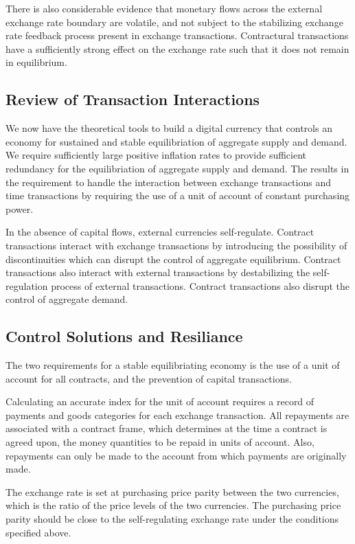 There is also considerable evidence that monetary flows across the external exchange rate boundary
are volatile, and not subject to the stabilizing exchange rate feedback process present in exchange
transactions. Contractural transactions have a sufficiently strong effect on the exchange rate such
that it does not remain in equilibrium.

\subsection{Review of Transaction Interactions}

We now have the theoretical tools to build a digital currency that controls an economy for
sustained and stable equilibriation of aggregate supply and demand. We require sufficiently large
positive inflation rates to provide sufficient redundancy for the equilibriation of aggregate supply
and demand. The results in the requirement to handle the interaction between exchange transactions
and time transactions by requiring the use of a unit of account of constant purchasing power.

In the absence of capital flows, external currencies self-regulate. Contract transactions interact
with exchange transactions by introducing the possibility of discontinuities which can disrupt the
control of aggregate equilibrium. Contract transactions also interact with external transactions by
destabilizing the self-regulation process of external transactions. Contract transactions also
disrupt the control of aggregate demand.

\subsection{Control Solutions and Resiliance}

The two requirements for a stable equilibriating economy is the use of a unit of account for all
contracts, and the prevention of capital transactions.

Calculating an accurate index for the unit of account requires a record of payments and goods
categories for each exchange transaction. All repayments are associated with a contract frame, which
determines at the time a contract is agreed upon, the money quantities to be repaid in units of
account. Also, repayments can only be made to the account from which payments are originally made.

The exchange rate is set at purchasing price parity between the two currencies, which is the ratio
of the price levels of the two currencies. The purchasing price parity should be close to the
self-regulating exchange rate under the conditions specified above.

